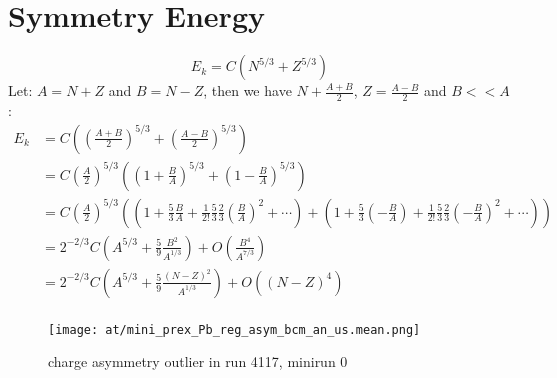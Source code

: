 \chapter{Symmetry Energy}
\label{ap:symmetry_energy}
$$ E_k = C(N^{5/3} + Z^{5/3}) $$
Let: $A = N + Z$ and $B = N - Z$, then we have $N + \frac{A+B}{2}$, 
$Z = \frac{A-B}{2}$ and $B << A$:
\begin{equation*}
    \begin{aligned}
	E_k &= C\left( \left( \frac{A+B}{2}\right)^{5/3} + \left(\frac{A-B}{2} \right)^{5/3} \right)	\\
	    &= C\left(\frac{A}{2}\right)^{5/3} \left( \left( 1 + \frac{B}{A} \right)^{5/3} + \left(1 - \frac{B}{A} \right)^{5/3} \right)   \\
	    &= C\left(\frac{A}{2}\right)^{5/3} \left( \left(1 + \frac{5}{3}\frac{B}{A} + \frac{1}{2!}\frac{5}{3}\frac{2}{3} \left( \frac{B}{A} \right)^2 + \cdots \right) 
		+ \left(1 + \frac{5}{3}\left(-\frac{B}{A} \right) + \frac{1}{2!}\frac{5}{3}\frac{2}{3} \left( -\frac{B}{A} \right)^2 + \cdots \right) \right) \\
	    &= 2^{-2/3}C\left( A^{5/3} + \frac{5}{9}\frac{B^2}{A^{1/3}} \right) + O(\frac{B^4}{A^{7/3}})	\\
	    &= 2^{-2/3}C\left( A^{5/3} + \frac{5}{9}\frac{(N-Z)^2}{A^{1/3}} \right) + O((N-Z)^4)	\\
    \end{aligned}
\end{equation*}

\begin{figure}
    \centering
    \texttt{[image: at/mini\_prex\_Pb\_reg\_asym\_bcm\_an\_us.mean.png]}
    \caption{charge asymmetry outlier in run 4117, minirun 0}
\end{figure}

